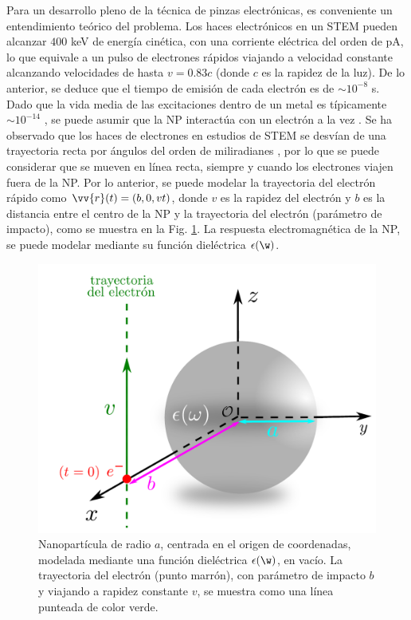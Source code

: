 Para un desarrollo pleno de la técnica de pinzas electrónicas, es conveniente un entendimiento teórico del problema. Los haces electrónicos en un STEM pueden alcanzar $400$ keV de energía cinética, con una corriente eléctrica del orden de pA, lo que equivale a un pulso de electrones rápidos viajando a velocidad constante alcanzando velocidades de hasta $v=0.83 c$ (donde $c$ es la rapidez de la luz). De lo anterior, se deduce que el tiempo de emisión de cada electrón es de $\sim 10^{-8}$ s. Dado que la vida media de las excitaciones dentro de un metal es típicamente $\sim 10^{-14}$ \cite{quijada2010lifetime}, se puede asumir que la NP interactúa con un electrón a la vez \cite{de1999relativistic, GarciadeAbajo-1, deabajo2021optical}. Se ha observado que los haces de electrones en estudios de STEM se desvían de una trayectoria recta por ángulos del orden de miliradianes \cite{deabajo2021optical, Rivacoba1, krehl2018spectral}, por lo que se puede considerar que se mueven en línea recta, siempre y cuando los electrones viajen fuera de la NP. Por lo anterior, se puede modelar la trayectoria del electrón rápido como $\vv{r}(t)=(b, 0, vt)$, donde $v$ es la rapidez del electrón y $b$ es la distancia entre el centro de la NP y la trayectoria del electrón (parámetro de impacto), como se muestra en la Fig. \ref{fig: system mine}. La respuesta electromagnética de la NP, se puede modelar mediante su función dieléctrica $\epsilon(\w)$.

\begin{figure}[ht!]
\centering
\includegraphics[width=0.5\linewidth]{17-imagenes/1-Intro/system_NP.pdf} 
\caption{Nanopartícula de radio $a$, centrada en el origen de coordenadas, modelada mediante una función dieléctrica $\epsilon(\w)$, en vacío. La trayectoria del electrón (punto marrón), con parámetro de impacto $b$ y viajando a rapidez constante $v$, se muestra como una línea punteada de color verde. \label{fig: system mine}}
\end{figure}

